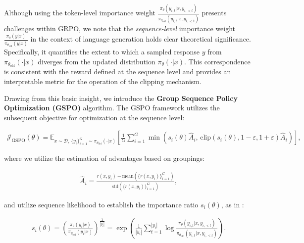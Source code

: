 Although using the token-level importance weight $\frac{ \pi_{\theta} (y_{i,t} | x, y_{i,<t}) }{ \pi_{\theta_\text{old}} (y_{i,t} | x,y_{i,<t})}$ presents challenges within GRPO, we note that the \textit{sequence-level} importance weight $\frac{ \pi_{\theta} (y | x) }{ \pi_{\theta_\text{old}} (y | x)}$ in the context of language generation holds clear theoretical significance. Specifically, it quantifies the extent to which a sampled response $y$ from $\pi_{\theta_\text{old}} (\cdot | x)$ diverges from the updated distribution $\pi_{\theta} (\cdot | x)$. This correspondence is consistent with the reward defined at the sequence level and provides an interpretable metric for the operation of the clipping mechanism.

Drawing from this basic insight, we introduce the \textbf{Group Sequence Policy Optimization (GSPO)} algorithm. The GSPO framework utilizes the subsequent objective for optimization at the sequence level:

\begin{align}
\mathcal{J}_\text{GSPO} (\theta) =
\mathbb{E}_{ x \sim \mathcal{D},\, \{y_i\}_{i=1}^G \sim \pi_{\theta_\text{old}}( \cdot | x) }
\left[ 
\frac{1}{G} \sum_{i=1}^{G}
\min \left( s_{i}(\theta)  \widehat{A}_{i},  \, \mathrm{clip} \left( s_{i}(\theta), 1 - {\varepsilon}, 1 + {\varepsilon} \right) \widehat{A}_{i} \right) 
\right],
\label{equ:gspo}
\end{align}

where we utilize the estimation of advantages based on groupings:

\begin{align}
\widehat{A}_{i} = \frac{r(x, y_i) - \mathrm{mean} \left( \{ r(x, y_i) \}_{i=1}^G \right) }{ \mathrm{std} \left( \{ r(x, y_i) \}_{i=1}^G \right) },
\end{align}

and utilize sequence likelihood to establish the importance ratio $s_{i}(\theta)$, as in \citet{click}:

\begin{align}
s_{i}(\theta) = \left( \frac{ \pi_{\theta} (y_i | x) }{ \pi_{\theta_\text{old}} (y_i | x)} \right)^{\frac{1}{|y_i|}}
=
\exp \left( \frac{1}{|y_i|} \sum_{t=1}^{|y_i|} \log \frac{ \pi_{\theta} (y_{i,t} | x, y_{i,<t}) }{ \pi_{\theta_\text{old}} (y_{i,t} | x,y_{i,<t})} \right).
\end{align}

